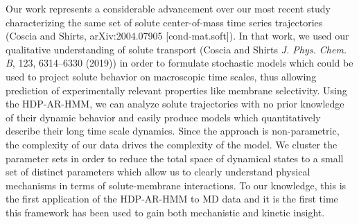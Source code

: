 \documentclass[fontsize=11pt]{article}
\begin{document}
	Our work represents a considerable advancement over our most recent study 
	characterizing the same set of solute center-of-mass time series trajectories
	(Coscia and Shirts, arXiv:2004.07905 [cond-mat.soft]). %
	In that work, we used our qualitative understanding of solute transport 
	(Coscia and Shirts \textit{J. Phys. Chem. B}, 123, 6314--6330 (2019)) in order
	to formulate stochastic models which could be used to project solute behavior
	on macroscopic time scales, thus allowing prediction of experimentally relevant
	properties like membrane selectivity. Using the HDP-AR-HMM, we can analyze solute
	trajectories with no prior knowledge of their dynamic behavior and easily produce
	models which quantitatively describe their long time scale dynamics. Since the 
	approach is non-parametric, the complexity of our data drives the complexity of
	the model. We cluster the parameter sets in order to reduce the total space of 
	dynamical states to a small set of distinct parameters which allow us to clearly
	understand physical	mechanisms in terms of solute-membrane interactions. To our 
	knowledge, this is the first application of the HDP-AR-HMM to MD data and it is
	the first time this framework has been used to gain both mechanistic and kinetic
	insight. 
	
\end{document}
